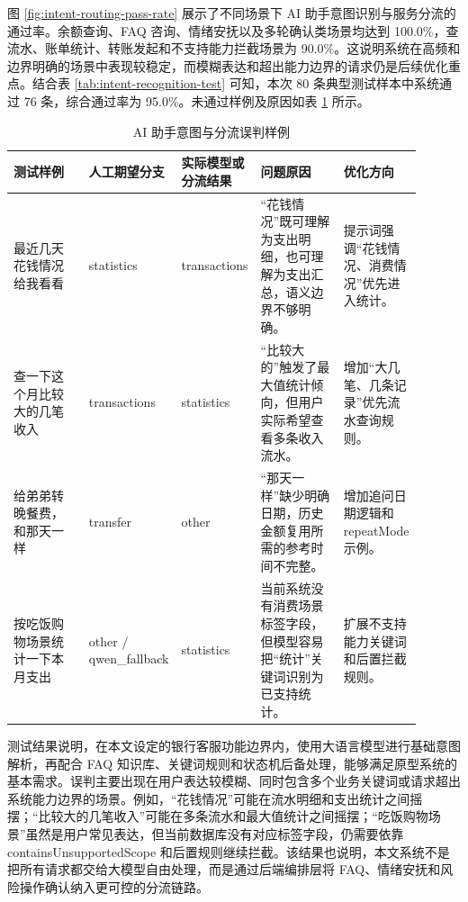 \documentclass[bachelor, print]{xduthesis}
\begin{document}
图 \ref{fig:intent-routing-pass-rate} 展示了不同场景下 AI 助手意图识别与服务分流的通过率。余额查询、FAQ 咨询、情绪安抚以及多轮确认类场景均达到 100.0\%，查流水、账单统计、转账发起和不支持能力拦截场景为 90.0\%。这说明系统在高频和边界明确的场景中表现较稳定，而模糊表达和超出能力边界的请求仍是后续优化重点。结合表 \ref{tab:intent-recognition-test} 可知，本次 80 条典型测试样本中系统通过 76 条，综合通过率为 95.0\%。未通过样例及原因如表 \ref{tab:intent-error-samples} 所示。

\begin{table}[H]
    \centering
    \caption{AI 助手意图与分流误判样例}
    \label{tab:intent-error-samples}
    \scriptsize
    \setlength{\tabcolsep}{2pt}
    \begin{tabular}{|p{0.22\linewidth}|p{0.14\linewidth}|p{0.17\linewidth}|p{0.24\linewidth}|p{0.13\linewidth}|}
        \hline
        测试样例 & 人工期望分支 & 实际模型或分流结果 & 问题原因 & 优化方向 \\
        \hline
        最近几天花钱情况给我看看 & statistics & transactions & “花钱情况”既可理解为支出明细，也可理解为支出汇总，语义边界不够明确。 & 提示词强调“花钱情况、消费情况”优先进入统计。 \\
        \hline
        查一下这个月比较大的几笔收入 & transactions & statistics & “比较大的”触发了最大值统计倾向，但用户实际希望查看多条收入流水。 & 增加“大几笔、几条记录”优先流水查询规则。 \\
        \hline
        给弟弟转晚餐费，和那天一样 & transfer & other & “那天一样”缺少明确日期，历史金额复用所需的参考时间不完整。 & 增加追问日期逻辑和 repeatMode 示例。 \\
        \hline
        按吃饭购物场景统计一下本月支出 & other / qwen\_fallback & statistics & 当前系统没有消费场景标签字段，但模型容易把“统计”关键词识别为已支持统计。 & 扩展不支持能力关键词和后置拦截规则。 \\
        \hline
    \end{tabular}
\end{table}

测试结果说明，在本文设定的银行客服功能边界内，使用大语言模型进行基础意图解析，再配合 FAQ 知识库、关键词规则和状态机后备处理，能够满足原型系统的基本需求。误判主要出现在用户表达较模糊、同时包含多个业务关键词或请求超出系统能力边界的场景。例如，“花钱情况”可能在流水明细和支出统计之间摇摆；“比较大的几笔收入”可能在多条流水和最大值统计之间摇摆；“吃饭购物场景”虽然是用户常见表达，但当前数据库没有对应标签字段，仍需要依靠 containsUnsupportedScope 和后置规则继续拦截。该结果也说明，本文系统不是把所有请求都交给大模型自由处理，而是通过后端编排层将 FAQ、情绪安抚和风险操作确认纳入更可控的分流链路。
\end{document}
